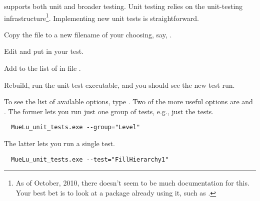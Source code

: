\muelu supports both unit and broader testing.  Unit testing relies on the \teuchos unit-testing infrastructure\footnote{As of
October, 2010, there
doesn't seem to be much documentation for this.  Your best bet is to look at a package already using it, such as .}.
Implementing new unit tests is straightforward.
\be
  \item Copy the file  to a new filename of your choosing, say, .
  \item Edit  and put in your test.
  \item Add  to the list of  in file .
  \item Rebuild, run the unit test executable, and you should see the new test run.
\ee

To see the list of available options, type .  Two of the more useful options
are  and .  The former lets you run just one group of tests, e.g., just the
 tests.
%
\begin{verbatim}
  MueLu_unit_tests.exe --group="Level"
\end{verbatim}
%
The latter lets you run a single test.
\begin{verbatim}
  MueLu_unit_tests.exe --test="FillHierarchy1"
\end{verbatim}
